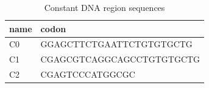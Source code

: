 \begin{table}[htbp]
\centering
\caption{Constant DNA region sequences}
\label{tab:table6}
\begin{tabular}{ll}
\toprule
name & codon \\
\midrule
C0 & GGAGCTTCTGAATTCTGTGTGCTG \\
C1 & CGAGCGTCAGGCAGCCTGTGTGCTG \\
C2 & CGAGTCCCATGGCGC \\
\bottomrule
\end{tabular}
\end{table}